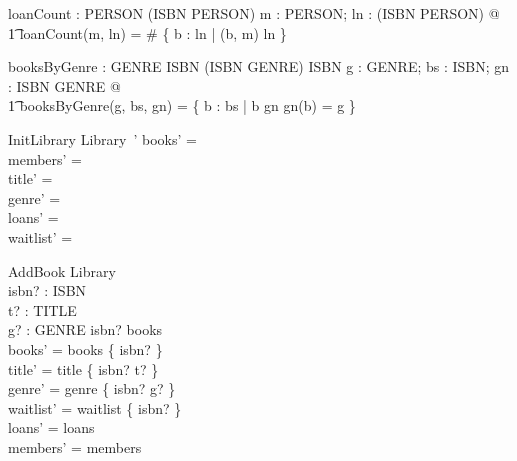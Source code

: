 \documentclass{article}
\begin{document}
\begin{axdef}
  loanCount : PERSON \cross \power (ISBN \cross PERSON) \fun \nat
\where
  \forall m : PERSON; ln : \power (ISBN \cross PERSON) @ \\
    \t1 loanCount(m, ln) = \# \{ b : \dom ln | (b, m) \in ln \}
\end{axdef}

\begin{axdef}
  booksByGenre : GENRE \cross \power ISBN \cross (ISBN \pfun GENRE) \fun \power ISBN
\where
  \forall g : GENRE; bs : \power ISBN; gn : ISBN \pfun GENRE @ \\
    \t1 booksByGenre(g, bs, gn) = \{ b : bs | b \in \dom gn \land gn(b) = g \}
\end{axdef}


\begin{schema}{InitLibrary}
  Library~'
\where
  books' = \emptyset \\
  members' = \emptyset \\
  title' = \emptyset \\
  genre' = \emptyset \\
  loans' = \emptyset \\
  waitlist' = \emptyset
\end{schema}


\begin{schema}{AddBook}
  \Delta Library \\
  isbn? : ISBN \\
  t? : TITLE \\
  g? : GENRE
\where
  isbn? \notin books \\
  books' = books \cup \{ isbn? \} \\
  title' = title \cup \{ isbn? \mapsto t? \} \\
  genre' = genre \cup \{ isbn? \mapsto g? \} \\
  waitlist' = waitlist \cup \{ isbn? \mapsto \langle \rangle \} \\
  loans' = loans \\
  members' = members
\end{schema}
\end{document}
